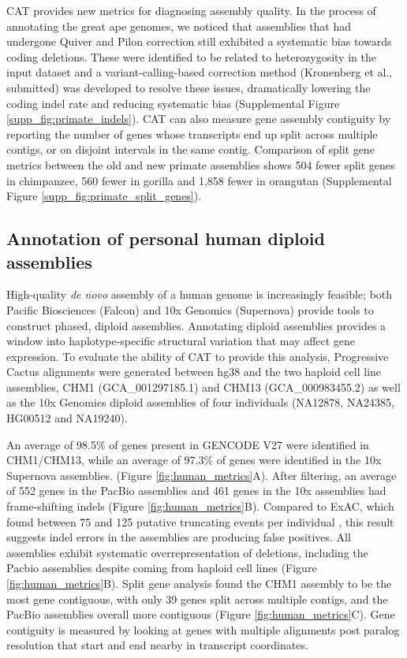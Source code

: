 \documentclass[fleqn,10pt]{wlscirep}
\begin{document}
CAT provides new metrics for diagnosing assembly quality. In the process of annotating the great ape genomes, we noticed that assemblies that had undergone Quiver and Pilon \cite{walker2014pilon} correction still exhibited a systematic bias towards coding deletions. These were identified to be related to heterozygosity in the input dataset and a variant-calling-based correction method (Kronenberg et al., submitted) was developed to resolve these issues, dramatically lowering the coding indel rate and reducing systematic bias (Supplemental Figure \ref{supp_fig:primate_indels}). CAT can also measure gene assembly contiguity by reporting the number of genes whose transcripts end up split across multiple contigs, or on disjoint intervals in the same contig. Comparison of split gene metrics between the old and new primate assemblies shows 504 fewer split genes in chimpanzee, 560 fewer in gorilla and 1,858 fewer in orangutan (Supplemental Figure \ref{supp_fig:primate_split_genes}).


\subsection*{Annotation of personal human diploid assemblies}

High-quality \textit{de novo} assembly of a human genome is increasingly feasible; both Pacific Biosciences \cite{chin2016phased,huddleston2016discovery,korlach2017novo} (Falcon) and 10x Genomics \cite{Weisenfeld070425} (Supernova) provide tools to construct phased, diploid assemblies. Annotating diploid assemblies provides a window into haplotype-specific structural variation that may affect gene expression. To evaluate the ability of CAT to provide this analysis, Progressive Cactus alignments were generated between hg38 and the two haploid cell line assemblies, CHM1 (GCA\_001297185.1) and CHM13 (GCA\_000983455.2) as well as the 10x Genomics diploid assemblies of four individuals (NA12878, NA24385, HG00512 and NA19240).

An average of 98.5\% of genes present in GENCODE V27 were identified in CHM1/CHM13, while an average of 97.3\% of genes were identified in the 10x Supernova assemblies. (Figure \ref{fig:human_metrics}A). After filtering, an average of 552 genes in the PacBio assemblies and 461 genes in the 10x assemblies had frame-shifting indels (Figure \ref{fig:human_metrics}B). Compared to ExAC, which found between 75 and 125 putative truncating events per individual \cite{karczewski2016exac}, this result suggests indel errors in the assemblies are producing false positives. All assemblies exhibit systematic overrepresentation of deletions, including the Pacbio assemblies despite coming from haploid cell lines (Figure \ref{fig:human_metrics}B). Split gene analysis found the CHM1 assembly to be the most gene contiguous, with only 39 genes split across multiple contigs, and the PacBio assemblies overall more contiguous (Figure \ref{fig:human_metrics}C). Gene contiguity is measured by looking at genes with multiple alignments post paralog resolution that start and end nearby in transcript coordinates.
\end{document}
